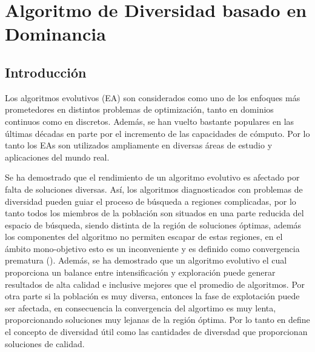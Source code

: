 \chapter{Algoritmo de Diversidad basado en Dominancia} %

\label{Chapter3}

\section{Introducción}

Los algoritmos evolutivos (EA) son considerados como uno de los enfoques más prometedores en distintos problemas de optimización, tanto en dominios continuos como en discretos.
%
Además, se han vuelto bastante populares en las últimas décadas en parte por el incremento de las capacidades de cómputo.
%
Por lo tanto los EAs son utilizados ampliamente en diversas áreas de estudio y aplicaciones del mundo real.
%

%

Se ha demostrado que el rendimiento de un algoritmo evolutivo es afectado por falta de soluciones diversas.
%
Así, los algoritmos diagnosticados con problemas de diversidad pueden guiar el proceso de búsqueda a regiones complicadas, por lo tanto todos los miembros de la población son situados en una parte reducida del espacio de búsqueda, siendo distinta de la región de soluciones óptimas, además los componentes del algoritmo no permiten escapar de estas regiones, en el ámbito mono-objetivo esto es un inconveniente y es definido como convergencia prematura (\cite{Joel:Crepinsek}).
%
Además, se ha demostrado que un algoritmo evolutivo el cual proporciona un balance entre intensificación y exploración puede generar resultados de alta calidad e inclusive mejores que el promedio de algoritmos.
%
Por otra parte si la población es muy diversa, entonces la fase de explotación puede ser afectada, en consecuencia la convergencia del algortimo es muy lenta, proporcionando soluciones muy lejanas de la región óptima.
%
Por lo tanto \citeauthor{Joel:mahfoud1995niching} en  define el concepto de diversidad útil como las cantidades de diversdad que proporcionan soluciones de calidad.
%

